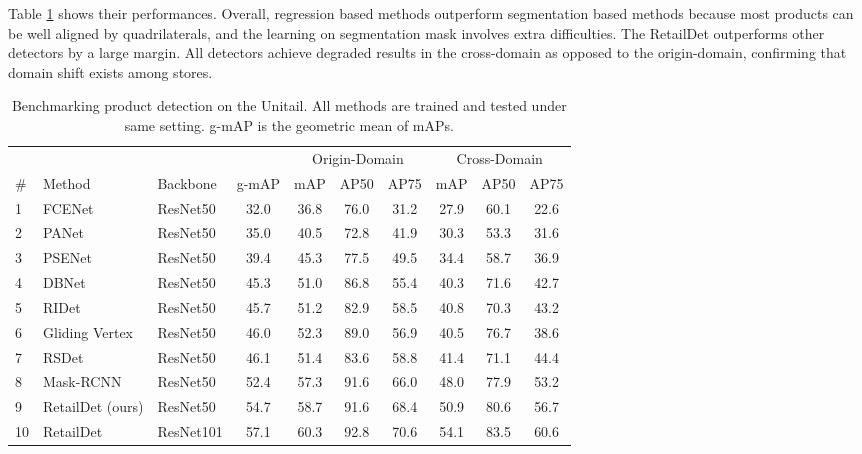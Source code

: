 \documentclass[runningheads]{llncs}
\begin{document}
Table \ref{tab:detection_benchmark} shows their performances. Overall, regression based methods outperform segmentation based methods because most products can be well aligned by quadrilaterals, and the learning on segmentation mask involves extra difficulties. The RetailDet outperforms other detectors by a large margin. All detectors achieve degraded results in the cross-domain as opposed to the origin-domain, confirming that domain shift exists among stores. 

\begin{table}
\centering
\caption{Benchmarking product detection on the Unitail. All methods are trained and tested under same setting. g-mAP is the geometric mean of mAPs. }
\begin{tabular}{ll|l|c|ccc|ccc}
\hline \hline
 &&&& \multicolumn{3}{c|}{Origin-Domain} & \multicolumn{3}{c}{Cross-Domain}\\
\#&Method                    & Backbone &g-mAP     & mAP  & AP50 & AP75   & mAP  & AP50 & AP75 \\ \hline
1&FCENet \cite{FCENet2021}   & ResNet50 &32.0      & 36.8 & 76.0 & 31.2   & 27.9 & 60.1 & 22.6 \\
2&PANet \cite{PANet2019}     & ResNet50 &35.0      & 40.5 & 72.8 & 41.9   & 30.3 & 53.3 & 31.6 \\
3&PSENet \cite{PSENet2019}   & ResNet50 &39.4      & 45.3 & 77.5 & 49.5   & 34.4 & 58.7 & 36.9 \\
4&DBNet \cite{DBNet2020}     & ResNet50 &45.3      & 51.0 & 86.8 & 55.4   & 40.3 & 71.6 & 42.7 \\
5&RIDet \cite{RIDet}         & ResNet50 &45.7      & 51.2 & 82.9 & 58.5   & 40.8 & 70.3 & 43.2 \\
6&Gliding Vertex\cite{xu2019gliding} & ResNet50 &46.0      & 52.3 & 89.0 & 56.9   & 40.5 & 76.7 & 38.6 \\
7&RSDet \cite{RSDet}         & ResNet50 &46.1      & 51.4 & 83.6 & 58.8   & 41.4 & 71.1 & 44.4 \\
8&Mask-RCNN \cite{he2017mask}& ResNet50 &52.4      & 57.3 & 91.6 & 66.0   & 48.0 & 77.9 & 53.2 \\ 
9&RetailDet (ours)    & ResNet50 &54.7      & 58.7 & 91.6 & 68.4   & 50.9 & 80.6 & 56.7 \\
10&RetailDet          & ResNet101&57.1      & 60.3 & 92.8 & 70.6   & 54.1 & 83.5 & 60.6 \\
\hline
\end{tabular}
\label{tab:detection_benchmark}
\end{table}
\end{document}
